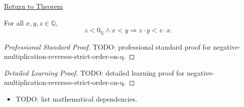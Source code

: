 \newpage
{}
\label{prf:negative-multiplication-reverses-strict-order-on-q}

\begin{remark*}[Return]
\hyperref[thm:negative-multiplication-reverses-strict-order-on-q]{Return to Theorem}
\end{remark*}

\begin{theorem*}
For all $x,y,z\in\mathbb{Q}$,
\[
z<0_{\mathbb{Q}}\land x<y
\Longrightarrow
z\cdot y<z\cdot x.
\]
\end{theorem*}

\begin{proof}[Professional Standard Proof]
\LRAProofBodyStart
TODO: professional standard proof for negative-multiplication-reverses-strict-order-on-q.
\end{proof}

\begin{proof}[Detailed Learning Proof]
\LRAProofBodyStart
TODO: detailed learning proof for negative-multiplication-reverses-strict-order-on-q.
\end{proof}

\begin{remark*}
\end{remark*}

\begin{dependencies}
\begin{itemize}
  \item TODO: list mathematical dependencies.
\end{itemize}
\end{dependencies}

\clearpage
